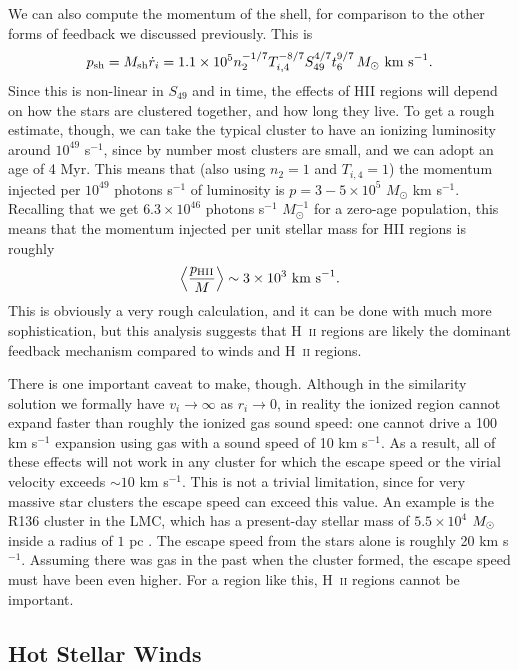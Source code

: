 We can also compute the momentum of the shell, for comparison to the other forms of feedback we discussed previously. This is
\begin{equation}
p_{\rm sh} = M_{\rm sh} \dot{r}_i = 1.1\times 10^5 n_2^{-1/7} T_{i,4}^{-8/7} S_{49}^{4/7} t_6^{9/7} \, M_\odot\mbox{ km s}^{-1}.
\end{equation}
Since this is non-linear in $S_{49}$ and in time, the effects of HII regions will depend on how the stars are clustered together, and how long they live. To get a rough estimate, though, we can take the typical cluster to have an ionizing luminosity around $10^{49}$ s$^{-1}$, since by number most clusters are small, and we can adopt an age of 4 Myr. This means that (also using $n_2 = 1$ and $T_{i,4} = 1$) the momentum injected per $10^{49}$ photons s$^{-1}$ of luminosity is $p = 3-5\times 10^5$ $M_\odot$ km s$^{-1}$. Recalling that we get $6.3\times 10^{46}$ photons s$^{-1}$ $M_\odot^{-1}$ for a zero-age population, this means that the momentum injected per unit stellar mass for HII regions is roughly
\begin{equation}
\left\langle\frac{p_{\rm HII}}{M}\right\rangle \sim 3\times 10^3\mbox{ km s}^{-1}.
\end{equation}
This is obviously a very rough calculation, and it can be done with much more sophistication, but this analysis suggests that H~\textsc{ii} regions are likely the dominant feedback mechanism compared to winds and H~\textsc{ii} regions.

There is one important caveat to make, though. Although in the similarity solution we formally have $v_i \rightarrow \infty$ as $r_i \rightarrow 0$, in reality the ionized region cannot expand faster than roughly the ionized gas sound speed: one cannot drive a 100 km s$^{-1}$ expansion using gas with a sound speed of 10 km s$^{-1}$. As a result, all of these effects will not work in any cluster for which the escape speed or the virial velocity exceeds $\sim 10$ km s$^{-1}$. This is not a trivial limitation, since for very massive star clusters the escape speed can exceed this value. An example is the R136 cluster in the LMC, which has a present-day stellar mass of $5.5\times 10^4$ $M_{\odot}$ inside a radius of $1$ pc \citep{hunter96a}. The escape speed from the stars alone is roughly 20 km s$^{-1}$. Assuming there was gas in the past when the cluster formed, the escape speed must have been even higher. For a region like this, H~\textsc{ii} regions cannot be important.

\subsection{Hot Stellar Winds}


